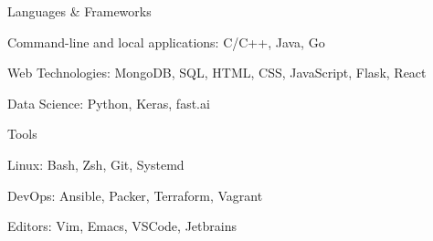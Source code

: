 
\begin{cventries}
  \cventry
    {}
    {Languages \& Frameworks}
    {}
    {}
    {
      \begin{cvitems}
        \item {Command-line and local applications: C/C++, Java, Go}
        \item {Web Technologies: MongoDB, SQL, HTML, CSS, JavaScript, Flask, React}
        \item {Data Science: Python, Keras, fast.ai}
      \end{cvitems}
    }
  \cventry
    {}
    {Tools}
    {}
    {}
    {
      \begin{cvitems}
        \item {Linux: Bash, Zsh, Git, Systemd}
        \item {DevOps: Ansible, Packer, Terraform, Vagrant}
        \item {Editors: Vim, Emacs, VSCode, Jetbrains}
      \end{cvitems}
    }
\end{cventries}
